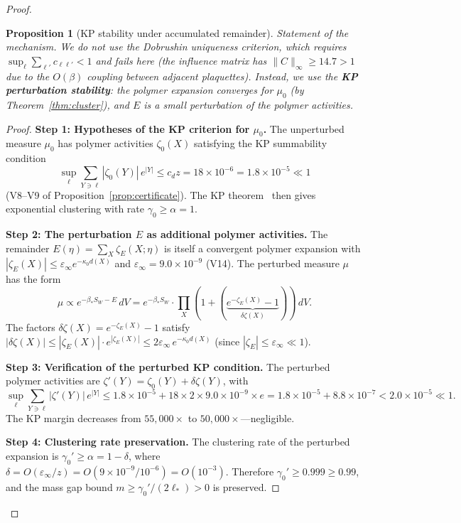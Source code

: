 \documentclass[11pt]{article}
\newtheorem{proposition}[theorem]{Proposition}
\theoremstyle{definition}
\begin{document}
\begin{proof}
\begin{proposition}[KP stability under accumulated remainder]
\emph{Statement of the mechanism.}
We do not use the Dobrushin uniqueness criterion,
which requires
$\sup_\ell\sum_{\ell'}c_{\ell\ell'}<1$ and fails here
\textup{(}the influence matrix has $\|C\|_\infty\ge 14.7>1$
due to the $O(\beta)$ coupling between adjacent plaquettes\textup{)}.
Instead, we use the \textbf{KP perturbation stability}:
the polymer expansion converges for $\mu_0$ \textup{(}by
Theorem~\ref{thm:cluster}\textup{)}, and $E$ is a
small perturbation of the polymer activities.
\end{proposition}

\begin{proof}
\textbf{Step 1: Hypotheses of the KP criterion for $\mu_0$.}
The unperturbed measure $\mu_0$ has polymer activities
$\zeta_0(X)$ satisfying the KP summability condition
\begin{equation}\label{eq:kp-unperturbed}
\sup_\ell\sum_{Y\ni\ell}|\zeta_0(Y)|\,e^{|Y|}
\le c_d z=18\times 10^{-6}=1.8\times 10^{-5}\ll 1
\end{equation}
(V8--V9 of Proposition~\ref{prop:certificate}).
The KP theorem~\cite{KP} then gives exponential clustering
with rate $\gamma_0\ge\alpha=1$.

\textbf{Step 2: The perturbation $E$ as additional polymer activities.}
The remainder $E(\eta)=\sum_{X}\zeta_E(X;\eta)$ is itself a
convergent polymer expansion with
$|\zeta_E(X)|\le\varepsilon_\infty e^{-\kappa_0 d(X)}$
and $\varepsilon_\infty=9.0\times 10^{-9}$ (V14).
The perturbed measure $\mu$ has the form
\[
\mu\propto e^{-\beta_* S_W-E}\,dV
=e^{-\beta_* S_W}\cdot\prod_X
(1+(\underbrace{e^{-\zeta_E(X)}-1}_{\delta\zeta(X)}))\,dV.
\]
The factors $\delta\zeta(X)=e^{-\zeta_E(X)}-1$ satisfy
$|\delta\zeta(X)|\le|\zeta_E(X)|\cdot e^{|\zeta_E(X)|}
\le 2\varepsilon_\infty\,e^{-\kappa_0 d(X)}$
(since $|\zeta_E|\le\varepsilon_\infty\ll 1$).

\textbf{Step 3: Verification of the perturbed KP condition.}
The perturbed polymer activities are
$\zeta'(Y)=\zeta_0(Y)+\delta\zeta(Y)$, with
\begin{equation}
\sup_\ell\sum_{Y\ni\ell}|\zeta'(Y)|\,e^{|Y|}
\le 1.8\times 10^{-5}+18\times 2\times 9.0\times 10^{-9}
\times e
=1.8\times 10^{-5}+8.8\times 10^{-7}
<2.0\times 10^{-5}\ll 1.
\end{equation}
The KP margin decreases from $55{,}000\times$ to
$50{,}000\times$---negligible.

\textbf{Step 4: Clustering rate preservation.}
The clustering rate of the perturbed expansion is
$\gamma_0'\ge\alpha=1-\delta$, where
$\delta=O(\varepsilon_\infty/z)
=O(9\times 10^{-9}/10^{-6})=O(10^{-3})$.
Therefore $\gamma_0'\ge 0.999\ge 0.99$, and the
mass gap bound $m\ge\gamma_0'/(2\ell_*)>0$ is preserved.


\end{proof}
\end{proof}
\end{document}
